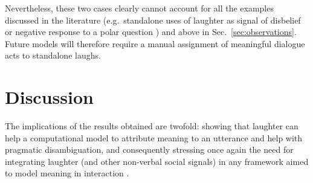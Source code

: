 \documentclass[11pt,a4paper]{article}
\begin{document}
Nevertheless, these two cases clearly cannot account for all the
examples discussed in the literature (e.g.\ standalone uses of
laughter as signal of disbelief or negative response to a polar
question \citealp{ginzburg2020laughter}) and above in
Sec.~\ref{sec:observations}. Future models will therefore require a
manual assignment of meaningful dialogue acts to standalone laughs.





\section{Discussion}
\label{sec:discussion}
The implications of the results obtained are twofold: showing that
laughter can help a computational model to attribute meaning to an
utterance and help with pragmatic disambiguation, and consequently
stressing once again the need for integrating laughter (and other
non-verbal social signals) in any framework aimed to model meaning in
interaction \citep{ginzburg2020laughter,maraev2021lacatoda}. %

\end{document}
